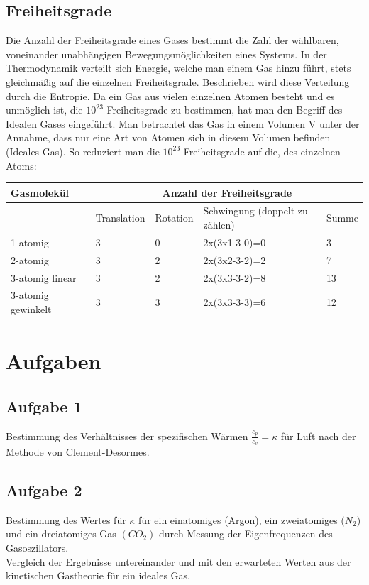 \documentclass{article}
\begin{document}
{{\subsection{Freiheitsgrade}
Die Anzahl der Freiheitsgrade eines Gases bestimmt die Zahl der wählbaren, voneinander unabhängigen Bewegungsmöglichkeiten eines Systems. In der Thermodynamik verteilt sich Energie, welche man einem Gas hinzu führt, stets gleichmäßig auf die einzelnen Freiheitsgrade. Beschrieben wird diese Verteilung durch die Entropie. Da ein Gas aus vielen einzelnen Atomen besteht und es unmöglich ist, die \(10^{23}\) Freiheitsgrade zu bestimmen, hat man den Begriff des Idealen Gases eingeführt. Man betrachtet das Gas in einem Volumen V unter der Annahme, dass nur eine Art von Atomen sich in diesem Volumen befinden (Ideales Gas). So reduziert man die \(10^{23}\) Freiheitsgrade auf die, des einzelnen Atoms:

\vspace{1cm}
\begin{tabular}{l|l|l|l|l}
Gasmolekül & \multicolumn{4}{c}{Anzahl der Freiheitsgrade}\\
\hline
& Translation & Rotation & Schwingung (doppelt zu zählen) & Summe\\
\hline
1-atomig & 3 & 0 & 2x(3x1-3-0)=0 & 3\\
2-atomig & 3 & 2 & 2x(3x2-3-2)=2 & 7\\
3-atomig linear & 3 & 2 & 2x(3x3-3-2)=8 & 13\\
3-atomig gewinkelt & 3 & 3 & 2x(3x3-3-3)=6 & 12\\ 
\end{tabular}

\vspace{2cm}
\section{Aufgaben}
\subsection{Aufgabe 1}
Bestimmung des Verhältnisses der spezifischen Wärmen \(\frac{c_{p}}{c_{v}}=\kappa \) für Luft nach der Methode von {\sc Clement-Desormes}.
\subsection{Aufgabe 2}
Bestimmung des Wertes für \(\kappa \)  für ein einatomiges (Argon), ein zweiatomiges \((N_{2}\)) und ein dreiatomiges Gas \((CO_{2})\) durch Messung der Eigenfrequenzen des Gasoszillators.\\
Vergleich der Ergebnisse untereinander und mit den erwarteten Werten aus der kinetischen Gastheorie für ein ideales Gas.

}}
\end{document}
